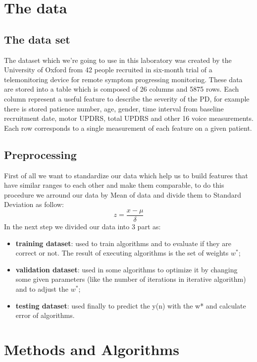 \documentclass[a4paper,12pt,oneside,titlepage]{article}
\begin{document}
	\section{The data}
	\subsection{The data set}
	The dataset which we’re going to use in this laboratory was created by the University of Oxford from 42 people recruited in six-month trial of a telemonitoring device for remote symptom progressing monitoring. These data are stored into a table which is composed of 26 columns and 5875 rows. Each column represent a useful feature to describe the severity of the PD, for example there is stored patience number, age, gender, time interval from baseline recruitment date, motor UPDRS, total UPDRS and other 16 voice measurements. Each row corresponds to a single measurement of each feature on a given patient.
	\subsection{Preprocessing}
	First of all we want to standardize our data which help us to build features that have similar ranges to each other and make them comparable, to do this procedure we arround our data by Mean of data and divide them to Standard Deviation as follow:
	\begin{equation}
	z = \frac {x - \mu}{\delta}
	\end{equation}
	In the next step we divided our data into 3 part as:
	\begin{itemize}
		\item \textbf{training dataset}: used to train algorithms and to evaluate if they are correct or not. The result of executing algorithms is the set of weights $w^*$;
		\item \textbf{validation dataset}: used in some algorithms to optimize it by changing some given parameters (like the number of iterations in iterative algorithm) and to adjust the $w^*$;
		\item \textbf{testing dataset}: used finally to predict the y(n) with the w* and calculate error of algorithms.
	\end{itemize}
	
	
	\section{Methods and Algorithms}
		
\end{document}
